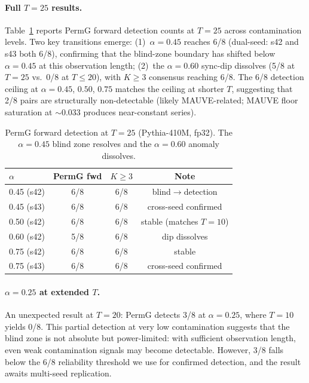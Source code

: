 \paragraph{Full $T{=}25$ results.}
Table~\ref{tab:t25_full} reports PermG forward detection counts at $T{=}25$ across contamination levels.
Two key transitions emerge: (1)~$\alpha{=}0.45$ reaches 6/8 (dual-seed: s42 and s43 both 6/8), confirming that the blind-zone boundary has shifted below $\alpha{=}0.45$ at this observation length; (2)~the $\alpha{=}0.60$ sync-dip dissolves (5/8 at $T{=}25$ vs.\ 0/8 at $T{\leq}20$), with $K{\geq}3$ consensus reaching 6/8.
The 6/8 detection ceiling at $\alpha{=}0.45$, $0.50$, $0.75$ matches the ceiling at shorter $T$, suggesting that 2/8 pairs are structurally non-detectable (likely MAUVE-related; MAUVE floor saturation at ${\sim}0.033$ produces near-constant series).

\begin{table}[t]
\centering
\small
\caption{PermG forward detection at $T{=}25$ (Pythia-410M, fp32). The $\alpha{=}0.45$ blind zone resolves and the $\alpha{=}0.60$ anomaly dissolves.}
\label{tab:t25_full}
\begin{tabular}{lccc}
\toprule
$\alpha$ & PermG fwd & $K{\geq}3$ & Note \\
\midrule
0.45 (s42) & 6/8 & 6/8 & blind$\to$detection \\
0.45 (s43) & 6/8 & 6/8 & cross-seed confirmed \\
0.50 (s42) & 6/8 & 6/8 & stable (matches $T{=}10$) \\
0.60 (s42) & 5/8 & 6/8 & dip dissolves \\
0.75 (s42) & 6/8 & 6/8 & stable \\
0.75 (s43) & 6/8 & 6/8 & cross-seed confirmed \\
\bottomrule
\end{tabular}
\end{table}

\paragraph{$\alpha{=}0.25$ at extended $T$.}
An unexpected result at $T{=}20$: PermG detects 3/8 at $\alpha{=}0.25$, where $T{=}10$ yields 0/8.
This partial detection at very low contamination suggests that the blind zone is not absolute but power-limited: with sufficient observation length, even weak contamination signals may become detectable.
However, 3/8 falls below the 6/8 reliability threshold we use for confirmed detection, and the result awaits multi-seed replication.

